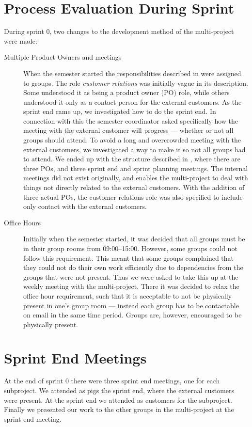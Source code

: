 \section{Process Evaluation During Sprint}
During sprint 0, two changes to the development method of the multi-project were made:

\begin{description}
  \item[Multiple Product Owners and meetings] When the semester started the responsibilities described in  were assigned to groups. The role \emph{customer relations} was initially vague in its description. Some understood it as being a product owner (PO) role, while others understood it only as a contact person for the external customers. As the sprint end came up, we investigated how to do the sprint end. In connection with this the semester coordinator asked specifically how the meeting with the external customer will progress --- whether or not all groups should attend. To avoid a long and overcrowded meeting with the external customers, we investigated a way to make it so not all groups had to attend. We ended up with the structure described in , where there are three POs, and three sprint end and sprint planning meetings. The internal meetings did not exist originally, and enables the multi-project to deal with things not directly related to the external customers. With the addition of three actual POs, the customer relations role was also specified to include only contact with the external customers.
  \item[Office Hours] Initially when the semester started, it was decided that all groups must be in their group rooms from 09:00--15:00. However, some groups could not follow this requirement. This meant that some groups complained that they could not do their own work efficiently due to dependencies from the groups that were not present. Thus we were asked to take this up at the weekly meeting with the multi-project. There it was decided to relax the office hour requirement, such that it is acceptable to not be physically present in one's group room --- instead each group has to be contactable on email in the same time period. Groups are, however, encouraged to be physically present.
\end{description}

\section{Sprint End Meetings}
At the end of sprint 0 there were three sprint end meetings, one for each subproject. We attended as pigs the \gui sprint end, where the external customers were present. At the \db sprint end we attended as customers for the \db subproject. Finally we presented our work to the other groups in the multi-project at the \bd sprint end meeting.

